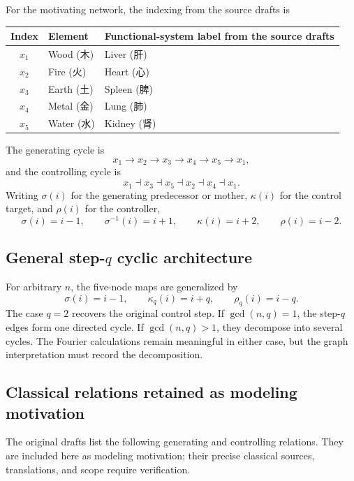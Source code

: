 \documentclass[11pt, reqno]{amsart}
\theoremstyle{definition}
\theoremstyle{remark}
\begin{document}
	For the motivating network, the indexing from the source drafts is
	\begin{center}
		\begin{tabular}{cll}
			\toprule
			Index & Element & Functional-system label from the source drafts \\
			\midrule
			$x_1$ & Wood (木)  & Liver (肝) \\
			$x_2$ & Fire (火)  & Heart (心) \\
			$x_3$ & Earth (土) & Spleen (脾) \\
			$x_4$ & Metal (金) & Lung (肺) \\
			$x_5$ & Water (水) & Kidney (肾) \\
			\bottomrule
		\end{tabular}
	\end{center}
	
	The generating cycle is
	\[
	x_1\longrightarrow x_2\longrightarrow x_3\longrightarrow x_4
	\longrightarrow x_5\longrightarrow x_1,
	\]
	and the controlling cycle is
	\[
	x_1\dashv x_3\dashv x_5\dashv x_2\dashv x_4\dashv x_1.
	\]
	Writing $\sigma(i)$ for the generating predecessor or mother,
	$\kappa(i)$ for the control target, and $\rho(i)$ for the controller,
	\begin{equation}
		\label{eq:five-maps}
		\sigma(i)=i-1,
		\qquad
		\sigma^{-1}(i)=i+1,
		\qquad
		\kappa(i)=i+2,
		\qquad
		\rho(i)=i-2.
	\end{equation}
	
	\subsection{General step-$q$ cyclic architecture}
	
	For arbitrary $n$, the five-node maps are generalized by
	\[
	\sigma(i)=i-1,
	\qquad
	\kappa_q(i)=i+q,
	\qquad
	\rho_q(i)=i-q.
	\]
	The case $q=2$ recovers the original control step.  If $\gcd(n,q)=1$, the
	step-$q$ edges form one directed cycle.  If $\gcd(n,q)>1$, they decompose into
	several cycles.  The Fourier calculations remain meaningful in either case,
	but the graph interpretation must record the decomposition.
	
	\subsection{Classical relations retained as modeling motivation}
	
	The original drafts list the following generating and controlling relations.
	They are included here as modeling motivation; their precise classical sources,
	translations, and scope require verification.
	
\end{document}
